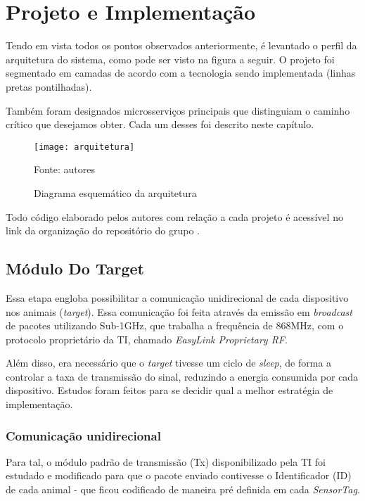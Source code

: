 \chapter{Projeto e Implementação}

Tendo em vista todos os pontos observados anteriormente, é levantado o perfil da arquitetura do sistema, como pode ser visto na figura a seguir. O projeto foi segmentado em camadas de acordo com a tecnologia sendo implementada (linhas pretas pontilhadas).

Também foram designados microsserviços principais que distinguiam o caminho crítico que desejamos obter. Cada um desses foi descrito neste capítulo.

\begin{figure}[ht]
  \centering
    \caption{Diagrama esquemático da arquitetura}
    \texttt{[image: arquitetura]}
  \centerline{\small{Fonte: autores}}
\end{figure}
\FloatBarrier

Todo código elaborado pelos autores com relação a cada projeto é acessível no link da organização do repositório do grupo \cite{github}.

\section{Módulo Do Target}

Essa etapa engloba possibilitar a comunicação unidirecional de cada dispositivo nos animais (\emph{target}). Essa comunicação foi feita através da emissão em \emph{broadcast} de pacotes utilizando Sub-1GHz, que trabalha a frequência de 868MHz, com o protocolo proprietário da TI, chamado \emph{EasyLink Proprietary RF}.

Além disso, era necessário que o \emph{target} tivesse um ciclo de \emph{sleep}, de forma a controlar a taxa de transmissão do sinal, reduzindo a energia consumida por cada dispositivo. Estudos foram feitos para se decidir qual a melhor estratégia de implementação.

\subsection{Comunicação unidirecional}

Para tal, o módulo padrão de transmissão (Tx) disponibilizado pela TI foi estudado e modificado para que o pacote enviado contivesse o Identificador (ID) de cada animal - que ficou codificado de maneira pré definida em cada \emph{SensorTag}.

